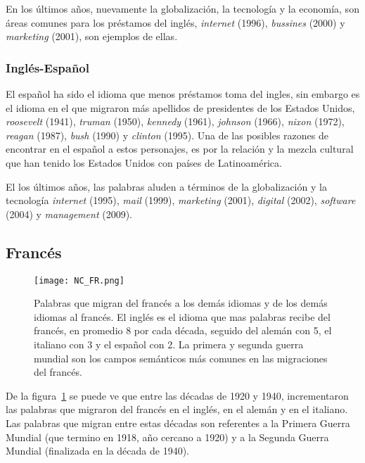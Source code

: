 En los últimos años, nuevamente la globalización, la tecnología y la economía, son áreas comunes para los préstamos del inglés, \textit{internet} (1996), \textit{bussines} (2000) y \textit{marketing} (2001), son ejemplos de ellas. 


\subsubsection*{Inglés-Español} 

El español ha sido el idioma que menos préstamos toma del ingles,  sin  embargo es el idioma en el que migraron más apellidos de presidentes de los Estados Unidos, \textit{roosevelt} (1941), \textit{truman} (1950), \textit{kennedy} (1961), \textit{johnson} (1966),  \textit{nixon} (1972),  \textit{reagan} (1987), \textit{bush} (1990) y \textit{clinton} (1995).  Una de las posibles razones de encontrar en el español a estos personajes,  es por la relación y la mezcla cultural que han tenido los Estados Unidos con países de Latinoamérica.  

El los últimos años, las palabras aluden a términos de la globalización y la tecnología  \textit{internet} (1995), \textit{mail} (1999), \textit{marketing} (2001),  \textit{digital} (2002), \textit{software} (2004) y \textit{management} (2009).  


\subsection{Francés} %

\begin{figure}[h!]
	\centering
	\texttt{[image: NC\_FR.png]}
	\caption{Palabras que migran del francés a los demás idiomas y de los demás idiomas al francés.  El inglés es el idioma que mas palabras recibe del francés, en promedio 8 por cada década, seguido del alemán con 5, el italiano con 3 y el español con 2. La primera y segunda guerra mundial son los campos semánticos más comunes en las migraciones del francés.}
	\label{fig.NC_FR}
	
	
\end{figure}

De la figura~\ref{fig.NC_FR} se puede ve que entre las décadas de 1920 y 1940,  incrementaron las palabras que migraron del francés en  el inglés, en el alemán y en el italiano. Las palabras que migran entre estas décadas son referentes a la Primera Guerra Mundial (que termino en 1918, año cercano a 1920) y a la Segunda Guerra Mundial (finalizada en la década de 1940). 

